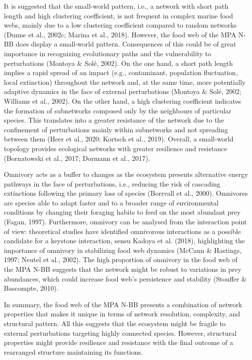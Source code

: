 \documentclass[preprint, 3p,
authoryear]{elsarticle} %
\begin{document}
It is suggested that the small-world pattern, i.e., a network with short
path length and high clustering coefficient, is not frequent in complex
marine food webs, mainly due to a low clustering coefficient compared to
random networks (Dunne et al., 2002c; Marina et al., 2018). However, the
food web of the MPA N-BB does display a small-world pattern.
Consequences of this could be of great importance in recognizing
evolutionary paths and the vulnerability to perturbations (Montoya \&
Solé, 2002). On the one hand, a short path length implies a rapid spread
of an impact (e.g., contaminant, population fluctuation, local
extinction) throughout the network and, at the same time, more
potentially adaptive dynamics in the face of external perturbations
(Montoya \& Solé, 2002; Williams et al., 2002). On the other hand, a
high clustering coefficient indicates the formation of subnetworks
composed only by the neighbours of particular species. This translates
into a greater resistance of the network due to the confinement of
perturbations mainly within subnetworks and not spreading between them
(Heer et al., 2020; Kortsch et al., 2019). Overall, a small-world
topology provides ecological networks with greater resilience and
resistance (Bornatowski et al., 2017; Dormann et al., 2017).

Omnivory acts as a buffer to changes as the ecosystem presents
alternative energy pathways in the face of perturbations, i.e., reducing
the risk of cascading extinctions following the primary loss of species
(Borrvall et al., 2000). Omnivores are species able to adapt faster and
to a broader range of environmental conditions by changing their
foraging habits to feed on the most abundant prey (Fagan, 1997).
Furthermore, omnivory can be analysed from the interaction point of
view: theoretical studies have identified omnivorous interactions as a
possible candidate for a keystone interaction, sensu Kadoya et al.
(2018), highlighting the importance of omnivory in stabilizing food web
dynamics (McCann \& Hastings, 1997; Neutel et al., 2002). The high
proportion of omnivory in the food web of the MPA N-BB suggests that the
network might be robust to variations in prey abundances, which could
increase food web's persistence and stability (Stouffer \& Bascompte,
2010).

In summary, the food web of the MPA N-BB presents a combination of
network properties that makes it unique in terms of network resolution,
complexity, and structural pattern. All this suggests that the ecosystem
might be fragile to external perturbations targeting highly connected
species. However, structural properties might provide resilience and
resistance with the final outcome of a rearranged structure maintaining
its functions.
\end{document}
